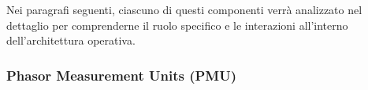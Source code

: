 Nei paragrafi seguenti, ciascuno di questi componenti verrà analizzato nel dettaglio per comprenderne il ruolo specifico e le interazioni all'interno dell'architettura operativa.



\subsubsection{Phasor Measurement Units (PMU)}










